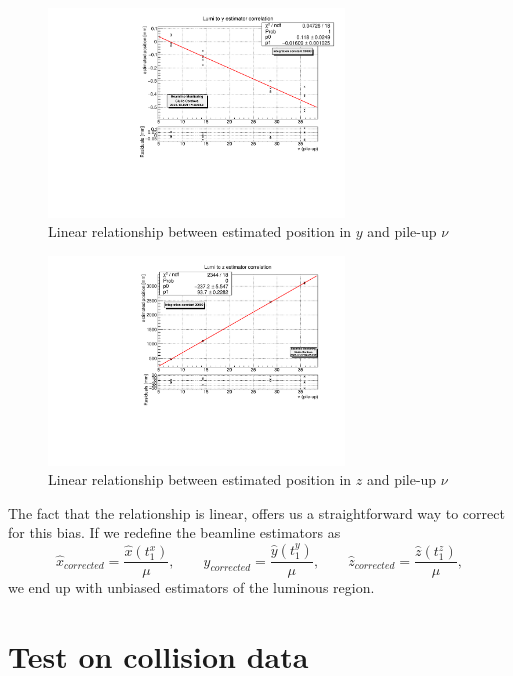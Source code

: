 \begin{figure}
    \centering
    \includegraphics[width=0.7\textwidth]{figures/y_to_lumi_fit_20000.pdf}
    \caption{Linear relationship between estimated position in $y$ and pile-up $\nu$}
    \label{fig:y_to_lumi}
\end{figure}
\begin{figure}
    \centering
    \includegraphics[width=0.7\textwidth]{figures/z_to_lumi_fit_20000_numpix.pdf}
    \caption{Linear relationship between estimated position in $z$ and pile-up $\nu$}
    \label{fig:z_to_lumi}
\end{figure}
The fact that the relationship is linear, offers us a straightforward way to correct for this bias. If we redefine the beamline estimators as
\begin{equation}
    \hat{x}_{corrected} =\frac{\hat{x}(t^x_1)}{\mu}, \qquad
    \hat{y}_{corrected} =\frac{\hat{y}(t^y_1)}{\mu}, \qquad
    \hat{z}_{corrected} =\frac{\hat{z}(t^z_1)}{\mu}, \label{x_hat_corrected}
    \end{equation}
we end up with unbiased estimators of the luminous region.
\section{Test on collision data}


